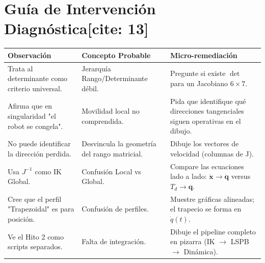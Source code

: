 \documentclass[11pt, a4paper]{article}
\begin{document}
\vspace{0.5cm}

\section*{Guía de Intervención Diagnóstica[cite: 13]}
\renewcommand{\arraystretch}{1.4}
\begin{tabularx}{\textwidth}{|>{\hsize=0.9\hsize}X|>{\hsize=0.9\hsize}X|>{\hsize=1.2\hsize}X|}
\hline
\rowcolor{gray!20} \textbf{Observación} & \textbf{Concepto Probable} & \textbf{Micro-remediación} \\ \hline
Trata al determinante como criterio universal. & Jerarquía Rango/Determinante débil. & Pregunte si existe $\det$ para un Jacobiano $6 \times 7$. \\ \hline
Afirma que en singularidad "el robot se congela". & Movilidad local no comprendida. & Pida que identifique qué direcciones tangenciales siguen operativas en el dibujo. \\ \hline
No puede identificar la dirección perdida. & Desvincula la geometría del rango matricial. & Dibuje los vectores de velocidad (columnas de J). \\ \hline
Usa $J^{-1}$ como IK Global. & Confusión Local vs Global. & Compare las ecuaciones lado a lado: $\dot{\mathbf{x}} \to \dot{\mathbf{q}}$ versus $T_d \to \mathbf{q}$. \\ \hline
Cree que el perfil "Trapezoidal" es para posición. & Confusión de perfiles. & Muestre gráficas alineadas; el trapecio se forma en $\dot{q}(t)$. \\ \hline
Ve el Hito 2 como scripts separados. & Falta de integración. & Dibuje el pipeline completo en pizarra (IK $\to$ LSPB $\to$ Dinámica). \\ \hline
\end{tabularx}
\end{document}
